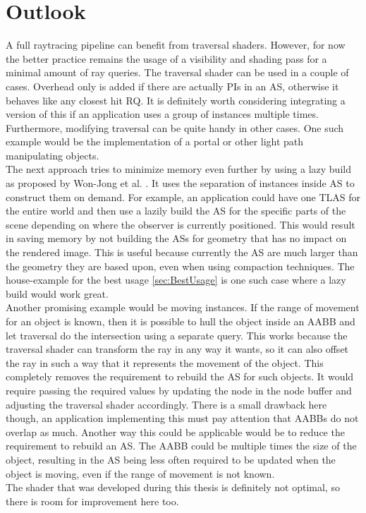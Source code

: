 \section{Outlook}
A full raytracing pipeline can benefit from traversal shaders. However, for now the better practice remains the usage of a visibility and shading pass for a minimal amount of ray queries. The traversal shader can be used in a couple of cases. Overhead only is added if there are actually PIs in an AS, otherwise it behaves like any closest hit RQ. It is definitely worth considering integrating a version of this if an application uses a group of instances multiple times. Furthermore, modifying traversal can be quite handy in other cases. One such example would be the implementation of a portal or other light path manipulating objects.\\
The next approach tries to minimize memory even further by using a lazy build as proposed by Won-Jong et al. \cite{traversalLazyBuild}. It uses the separation of instances inside AS to construct them on demand. For example, an application could have one TLAS for the entire world and then use a lazily build the AS for the specific parts of the scene depending on where the observer is currently positioned. This would result in saving memory by not building the ASs for geometry that has no impact on the rendered image. This is useful because currently the AS are much larger than the geometry they are based upon, even when using compaction techniques. The house-example for the best usage \ref{sec:BestUsage} is one such case where a lazy build would work great.\\
Another promising example would be moving instances. If the range of movement for an object is known, then it is possible to hull the object inside an AABB and let traversal do the intersection using a separate query. This works because the traversal shader can transform the ray in any way it wants, so it can also offset the ray in such a way that it represents the movement of the object. This completely removes the requirement to rebuild the AS for such objects. It would require passing the required values by updating the node in the node buffer and adjusting the traversal shader accordingly. There is a small drawback here though, an application implementing this must  pay attention that AABBs do not overlap as much. Another way this could be applicable would be to reduce the requirement to rebuild an AS. The AABB could be multiple times the size of the object, resulting in the AS being less often required to be updated when the object is moving, even if the range of movement is not known.\\
The shader that was developed during this thesis is definitely not optimal, so there is room for improvement here too.

